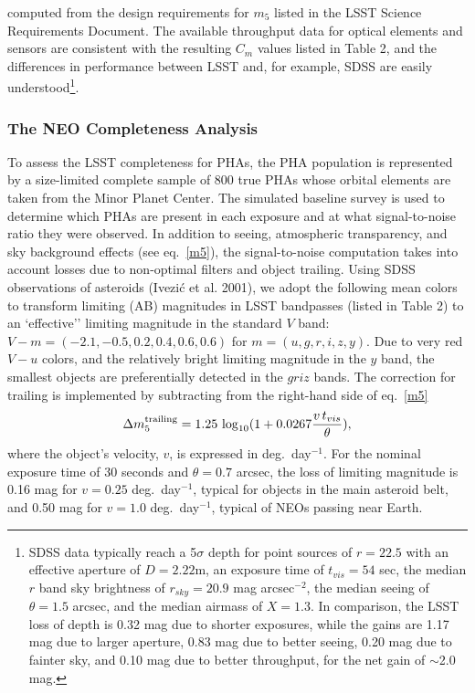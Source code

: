 \documentclass{emulateapj}
\newcommand{\B}[1]{{#1}}
\begin{document}
\B{computed from the design requirements for $m_5$ listed in the
LSST Science Requirements Document. The available throughput data for
optical elements and sensors are consistent with the resulting $C_m$ values 
listed in Table 2, and the differences in performance between LSST and,
for example, SDSS are easily understood\footnote{SDSS data 
typically reach a 5$\sigma$ depth for point sources of $r=22.5$ 
with an effective aperture of $D=2.22$m, an exposure time of $t_{vis}=54$ 
sec, the median $r$ band sky brightness of $r_{sky}=20.9$ mag arcsec$^{-2}$, 
the median seeing of $\theta=1.5$ arcsec, and the median airmass of $X=1.3$.
In comparison, the LSST loss of depth is 0.32 mag due to shorter exposures,
while the gains are 1.17 mag due to larger aperture, 0.83 mag due to better 
seeing, 0.20 mag due to fainter sky, and 0.10 mag due to better throughput,
for the net gain of $\sim$2.0 mag.}.}


\subsubsection{   The NEO Completeness Analysis    } 
\label{Sec:NEOc}
To assess the LSST completeness for PHAs, the PHA 
population is represented by a size-limited complete sample of 800 true
PHAs whose orbital elements are taken from the Minor Planet Center.
The simulated baseline survey is used to determine which PHAs are present in
each exposure and at what signal-to-noise ratio they were observed. In 
addition to  seeing, atmospheric transparency, and sky background effects
(see eq.~\ref{m5}), the signal-to-noise computation takes into account losses 
due to non-optimal filters and object trailing. Using SDSS observations
of asteroids (Ivezi\'c et al. 2001), we adopt the following mean colors to 
transform limiting (AB) magnitudes in LSST bandpasses (listed in Table 2)
to an `effective'' limiting magnitude in the standard $V$ band: 
$V-m=(-2.1, -0.5, 0.2, 0.4, 0.6, 0.6)$ for $m=(u,g,r,i,z,y)$. Due to 
very red $V-u$ colors, and the relatively bright limiting magnitude in the $y$ 
band, the smallest objects are preferentially detected in the $griz$ bands.
The correction for trailing is implemented by subtracting from the right-hand 
side of eq.~\ref{m5}
\begin{equation}
 \Delta m_5^{\rm trailing} = 1.25\,\log_{10}(1+0.0267{v \,t_{vis} \over \theta}),
\end{equation}
where the object's velocity, $v$, is expressed in deg.~day$^{-1}$. For the nominal
exposure time of 30 seconds and $\theta=0.7$ arcsec, the loss of limiting 
magnitude is 0.16 mag for $v=0.25$ deg.~day$^{-1}$, typical for objects in the main 
asteroid belt, and 0.50 mag for $v=1.0$ deg.~day$^{-1}$, typical of NEOs passing
near Earth. 
\end{document}
